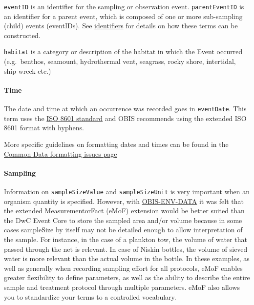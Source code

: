 \documentclass[
  letterpaper,
  DIV=11,
  numbers=noendperiod,
  oneside]{scrreprt}
\let\oldparagraph\paragraph
\renewcommand{\paragraph}[1]{\oldparagraph{#1}\mbox{}}
\begin{document}
\texttt{eventID} is an identifier for the sampling or observation event.
\texttt{parentEventID} is an identifier for a parent event, which is
composed of one or more sub-sampling (child) events (eventIDs). See
\protect\hyperlink{eventid}{identifiers} for details on how these terms
can be constructed.

\texttt{habitat} is a category or description of the habitat in which
the Event occurred (e.g.~benthos, seamount, hydrothermal vent, seagrass,
rocky shore, intertidal, ship wreck etc.)

\hypertarget{time}{%
\paragraph{Time}\label{time}}

The date and time at which an occurrence was recorded goes in
\texttt{eventDate}. This term uses the
\href{https://en.wikipedia.org/wiki/ISO_8601}{ISO 8601 standard} and
OBIS recommends using the extended ISO 8601 format with hyphens.

More specific guidelines on formatting dates and times can be found in
the \protect\hyperlink{temporal-dates-and-times}{Common Data formatting
issues page}

\hypertarget{sampling}{%
\paragraph{Sampling}\label{sampling}}

Information on \texttt{sampleSizeValue} and \texttt{sampleSizeUnit} is
very important when an organism quantity is specified. However, with
\href{data_format.html}{OBIS-ENV-DATA} it was felt that the extended
MeasurementorFact
(\href{http://rs.gbif.org/extension/obis/extended_measurement_or_fact.xml}{eMoF})
extension would be better suited than the DwC Event Core to store the
sampled area and/or volume because in some cases sampleSize by itself
may not be detailed enough to allow interpretation of the sample. For
instance, in the case of a plankton tow, the volume of water that passed
through the net is relevant. In case of Niskin bottles, the volume of
sieved water is more relevant than the actual volume in the bottle. In
these examples, as well as generally when recording sampling effort for
all protocols, eMoF enables greater flexibility to define parameters, as
well as the ability to describe the entire sample and treatment protocol
through multiple parameters. eMoF also allows you to standardize your
terms to a controlled vocabulary.
\end{document}
